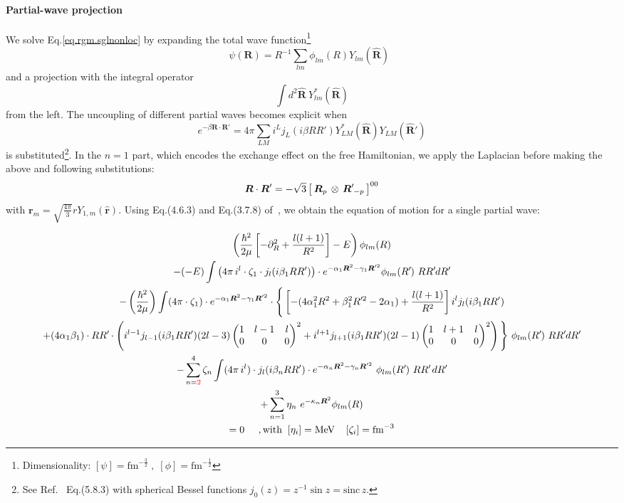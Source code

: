 \documentclass[onecolumn,preprint,superscriptaddress,nofootinbib,notitlepage,10pt,linenumbers]{revtex4-1}
\newcommand*{\mprime}{^{\prime}\mkern-1.2mu}
\newcommand{\red}[1]{\textcolor{red}{#1}}
\newcommand{\la}{\label}
\newcommand{\be}{\begin{equation}}
\newcommand{\ee}{\end{equation}}
\newcommand{\ve}[1]{\ensuremath{\boldsymbol{#1}}}
\newcommand{\coup}[3]{\left[\,#1\,\otimes\,#2\,\right]^{#3}}
\newcommand{\threej}[6]{ \begin{pmatrix}
   #1 & #2 & #3 \\
   #4 & #5 & #6 
  \end{pmatrix}}
\begin{document}
\paragraph{Partial-wave projection} We solve Eq.\eqref{eq.rgm.sglnonloc} by expanding
the total wave function\footnote{Dimensionality: $[\psi]=\text{fm}^{-\frac{3}{2}}\;,\;[\phi]=\text{fm}^{-\frac{1}{2}}$}
\be
\psi(\ve{R})=R^{-1}\sum_{lm}\phi_{lm}(R)Y_{lm}(\hat{\ve{R}})\;\;
\ee
and a projection with the integral operator
\be
\int d^2\hat{\ve{R}}~Y^*_{lm}(\hat{\ve{R}})
\ee
from the left. The uncoupling of different partial waves becomes explicit when
\be
e^{-\beta\ve{R}\cdot\ve{R}'}=4\pi\sum_{LM}i^Lj_L(i\beta RR')Y^*_{LM}(\hat{\ve{R}})Y_{LM}(\hat{\ve{R}}')
\ee
is substituted\footnote{See Ref.~\cite{Edmonds} Eq.(5.8.3) with spherical Bessel functions $j_0(z)=z^{-1}\sin z=\text{sinc}\,z$.}. In the $n=1$ part, which encodes the exchange effect on the free
Hamiltonian, we apply the Laplacian before making the above and following
substitutions:
\be
\ve{R}\cdot\ve{R}'=-\sqrt{3}\coup{\ve{R}_p}{\ve{R}\mprime_{-p}}{00}
\ee
with $\ve{r}_m=\sqrt{\frac{4\pi}{3}}rY_{1,m}(\hat{\ve{r}})$. Using Eq.(4.6.3) and
Eq.(3.7.8) of~\cite{Edmonds}, we obtain the equation of motion for a single
partial wave:
\begin{widetext}
\begin{subequations}\la{eq.rgm.sglnonloc.pw}
\begin{gather}
\left(\frac{\hbar^2}{2\mu}\left[-\partial^2_R+\frac{l(l+1)}{R^2}\right]-E\right)
\phi_{lm}(R)\\
-(-E)\int
\left(4\pi\,i^l\cdot\zeta_1\cdot j_l(i\beta_1 RR')\right)\cdot
 e^{-\alpha_1\ve{R}^2-\gamma_1\ve{R}'^2}\phi_{lm}(R\mprime)~RR\mprime dR\mprime
 \la{eq.rgm.sglnonloc.pw.Eex}\\
-\left(\frac{\hbar^2}{2\mu}\right)\int
(4\pi\cdot\zeta_1) \cdot e^{-\alpha_1\ve{R}^2-\gamma_1\ve{R}'^2}
\cdot\Bigg\lbrace
\left[-(4\alpha_1^2R^2+\beta_1^2R\mprime^2-2\alpha_1)+\frac{l(l+1)}{R^2}\right]
 i^l j_{l}(i\beta_1 RR')\nonumber\\
+(4\alpha_1\beta_1)\cdot RR\mprime\cdot
 \left(i^{l-1} j_{l-1}(i\beta_1 RR') (2l-3)
 \threej{1}{l-1}{l}{0}{0}{0}^2+
 i^{l+1} j_{l+1}(i\beta_1 RR') (2l-1)
 \threej{1}{l+1}{l}{0}{0}{0}^2\right)\Bigg\rbrace
~\phi_{lm}(R\mprime)~RR\mprime dR\mprime\la{eq.rgm.sglnonloc.pw.tex}\\
-\sum_{n=\red{2}}^4\zeta_n\int
(4\pi\,i^l)\cdot j_l(i\beta_n RR')\cdot 
e^{-\alpha_n\ve{R}^2-\gamma_n\ve{R}'^2}~\phi_{lm}(R\mprime)~RR\mprime\,dR\mprime\la{eq.rgm.sglnonloc.pw.noloc}\\
+\sum_{n=1}^3\eta_n~e^{-\kappa_n\ve{R}^2}\phi_{lm}(R)\la{eq.rgm.sglnonloc.pw.t}\\
 =0\;\;\;\;\;,\text{with}\;\;[\eta_i]=\text{MeV}\;\;\;\;[\zeta_i]=\text{fm}^{-3}\nonumber
\end{gather}
\end{subequations}
\end{widetext}
\end{document}
